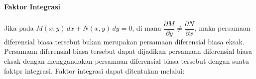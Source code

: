 \paragraph{Faktor Integrasi}
\label{par:FI}

Jika pada \begin{math} M(x, y) \, dx + N(x, y) \, dy = 0 \end{math}, di mana \begin{math} \dfrac{\partial M}{\partial y} \neq \dfrac{\partial N}{\partial x} \end{math}, maka persamaan diferensial biasa tersebut bukan merupakan persamaan diferensial biasa eksak. Persamaan
diferensial biasa tersebut dapat dijadikan persamaan diferensial biasa eksak dengan menggandakan persamaan diferensial biasa tersebut dengan suatu faktpr integrasi. Faktor integrasi dapat ditentukan melalui:


